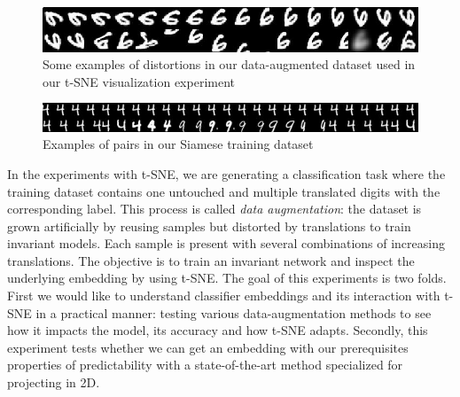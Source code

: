 \documentclass[a4paper,12pt]{report}
\begin{document}
\begin{figure}[h]
    \begin{center}
        \includegraphics{thesis_figures/mnist_transfo_tsne.jpg}
    \end{center}
    \caption{Some examples of distortions in our data-augmented dataset used in our t-SNE visualization experiment}
    \label{fig:mnist_transfo_tsne}
\end{figure}

\begin{figure}[h]
    \begin{center}
        \includegraphics{thesis_figures/mnist_pairs.jpg}
    \end{center}
    \caption{Examples of pairs in our Siamese training dataset}
    \label{fig:mnist_pairs}
\end{figure}

In the experiments with t-SNE, we are generating a classification task where the training dataset contains one untouched and multiple translated digits with the corresponding label.
This process is called {\em data augmentation}: the dataset is grown artificially by reusing samples but distorted by translations to train invariant models.
Each sample is present with several combinations of increasing translations.
The objective is to train an invariant network and inspect the underlying embedding by using t-SNE.
The goal of this experiments is two folds.
First we would like to understand classifier embeddings and its interaction with t-SNE in a practical manner: testing various data-augmentation methods to see how it impacts the model, its accuracy and how t-SNE adapts.
Secondly, this experiment tests whether we can get an embedding with our prerequisites properties of predictability with a state-of-the-art method specialized for projecting in 2D.
\end{document}
